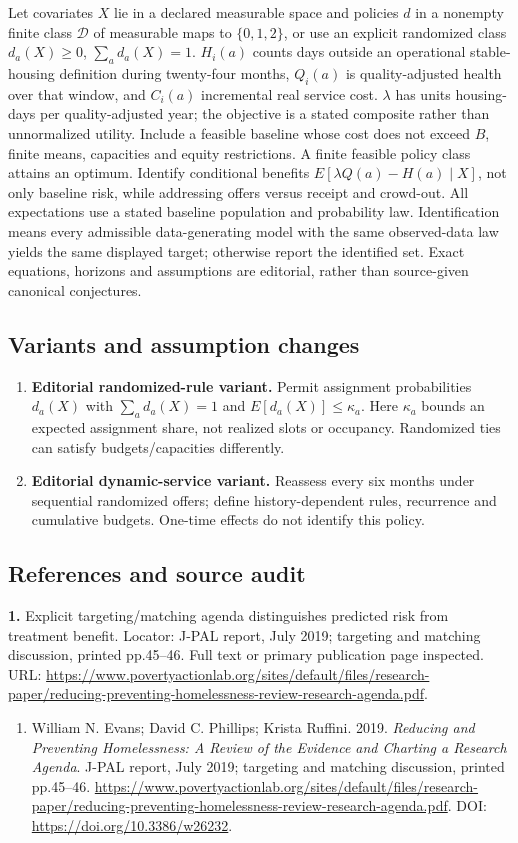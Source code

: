 \documentclass[11pt,a4paper]{article}
\begin{document}
Let covariates \(X\) lie in a declared measurable space and policies \(d\) in a nonempty finite class \(\mathcal D\) of measurable maps to \(\{0,1,2\}\), or use an explicit randomized class \(d_a(X)\geq0\), \(\sum_ad_a(X)=1\). \(H_i(a)\) counts days outside an operational stable-housing definition during twenty-four months, \(Q_i(a)\) is quality-adjusted health over that window, and \(C_i(a)\) incremental real service cost. \(\lambda\) has units housing-days per quality-adjusted year; the objective is a stated composite rather than unnormalized utility. Include a feasible baseline whose cost does not exceed \(B\), finite means, capacities and equity restrictions. A finite feasible policy class attains an optimum. Identify conditional benefits \(E[\lambda Q(a)-H(a)\mid X]\), not only baseline risk, while addressing offers versus receipt and crowd-out. All expectations use a stated baseline population and probability law. Identification means every admissible data-generating model with the same observed-data law yields the same displayed target; otherwise report the identified set. Exact equations, horizons and assumptions are editorial, rather than source-given canonical conjectures.
\subsection*{Variants and assumption changes}
\begin{enumerate}
\item \textbf{Editorial randomized-rule variant.} Permit assignment probabilities \(d_a(X)\) with \(\sum_a d_a(X)=1\) and \(E[d_a(X)]\leq\kappa_a\). Here \(\kappa_a\) bounds an expected assignment share, not realized slots or occupancy. Randomized ties can satisfy budgets/capacities differently.
\item \textbf{Editorial dynamic-service variant.} Reassess every six months under sequential randomized offers; define history-dependent rules, recurrence and cumulative budgets. One-time effects do not identify this policy.
\end{enumerate}
\subsection*{References and source audit}
\textbf{1.} Explicit targeting/matching agenda distinguishes predicted risk from treatment benefit. Locator: J-PAL report, July 2019; targeting and matching discussion, printed pp.45–46. Full text or primary publication page inspected. URL: \url{https://www.povertyactionlab.org/sites/default/files/research-paper/reducing-preventing-homelessness-review-research-agenda.pdf}.
\begin{enumerate}\raggedright
\item\hypertarget{definitions:source:30007751:1}{} William N. Evans; David C. Phillips; Krista Ruffini. 2019. \emph{Reducing and Preventing Homelessness: A Review of the Evidence and Charting a Research Agenda}. J-PAL report, July 2019; targeting and matching discussion, printed pp.45–46.
\url{https://www.povertyactionlab.org/sites/default/files/research-paper/reducing-preventing-homelessness-review-research-agenda.pdf}.
DOI: \url{https://doi.org/10.3386/w26232}.
\end{enumerate}
\end{document}
